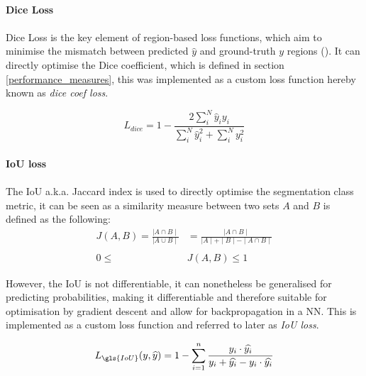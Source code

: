 \paragraph{Dice Loss}
\paragraph{}
Dice Loss is the key element of region-based loss functions, which aim to minimise the mismatch between predicted $\widehat{y}$  and ground-truth $y$ regions (\cite{LossOdyssey}). It can directly optimise the Dice coefficient, which is defined in section \ref{performance_measures}, this was implemented as a custom loss function hereby known as \textit{dice coef loss}.

\begin{equation}\label{eq_dice_loss}
L_{dice}=1-\frac{2\sum_{{i}}^{N}\widehat{y}_{i}y_{i}}{\sum_{i}^{N}\widehat{y}_{i}^{2}+\sum_{i}^{N}y_{{i}}^{2}}
\end{equation}

\paragraph{\gls{IoU} loss}
\paragraph{}
The \gls{IoU} \gls{a.k.a.} Jaccard index is used to directly optimise the segmentation class metric, it can be seen as a similarity measure between two sets $A$ and $B$ is defined as the following:
\begin{equation}
\label{eq_jaccard}
\begin{aligned}
J(A, B) = \frac{\mid A \cap B \mid }{\mid A \cup B \mid} &= \frac{\mid A \cap B \mid}{\mid A \mid + \mid B \mid - \mid A \cap B \mid} \\ \\
0 \le & J(A, B) \le 1
\end{aligned}
\end{equation}

However, the \gls{IoU} is not differentiable, it can nonetheless be generalised for predicting probabilities, making it differentiable and therefore suitable for optimisation by gradient descent and allow for backpropagation in a \gls{NN}. This is implemented as a custom loss function and referred to later as \textit{\gls{IoU} loss}.

\begin{equation} \label{eq_iou_loss}
L_{\gls{IoU}}(y, \widehat{y}) = 1- \sum_{i=1}^n \frac{y_i \cdot \widehat{y_i}}{y_i + \widehat{y_i} - y_i \cdot \widehat{y_i}}
\end{equation}

